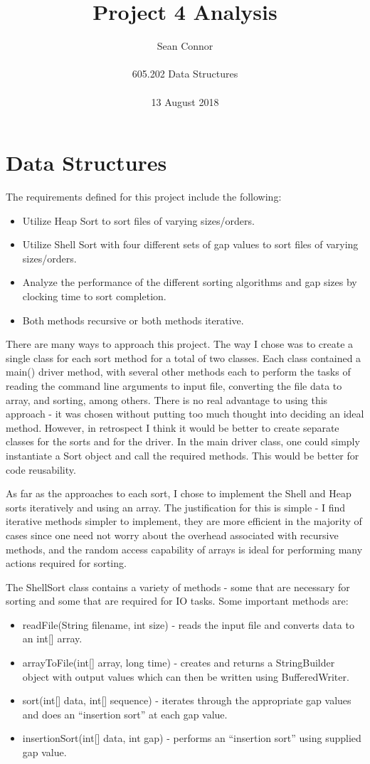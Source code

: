 \documentclass[12pt, titlepage]{article}
\title{Project 4 Analysis}
\author{Sean Connor \\ \\ 605.202 Data Structures \\ \\ 13 August 2018}
\date{}
\begin{document}
\maketitle


\section {Data Structures}

The requirements defined for this project include the following:
\begin{itemize}
	\item Utilize Heap Sort to sort files of varying sizes/orders.
	\item Utilize Shell Sort with four different sets of gap values to sort files of varying sizes/orders.
	\item Analyze the performance of the different sorting algorithms and gap sizes by clocking time to sort completion.
	\item Both methods recursive or both methods iterative.
\end{itemize}

There are many ways to approach this project. The way I chose was to create a single class for each sort method for a total of two classes. Each class contained a main() driver method, with several other methods each to perform the tasks of reading the command line arguments to input file, converting the file data to array, and sorting, among others. There is no real advantage to using this approach - it was chosen without putting too much thought into deciding an ideal method. However, in retrospect I think it would be better to create separate classes for the sorts and for the driver. In the main driver class, one could simply instantiate a Sort object and call the required methods. This would be better for code reusability.

As far as the approaches to each sort, I chose to implement the Shell and Heap sorts iteratively and using an array. The justification for this is simple - I find iterative methods simpler to implement, they are more efficient in the majority of cases since one need not worry about the overhead associated with recursive methods, and the random access capability of arrays is ideal for performing many actions required for sorting. 

The ShellSort class contains a variety of methods - some that are necessary for sorting and some that are required for IO tasks. Some important methods are:
\begin{itemize}
	\item readFile(String filename, int size) - reads the input file and converts data to an int[] array.
	\item arrayToFile(int[] array, long time) - creates and returns a StringBuilder object with output values which can then be written using BufferedWriter. 
	\item sort(int[] data, int[] sequence) - iterates through the appropriate gap values and does an ``insertion sort'' at each gap value.
	\item insertionSort(int[] data, int gap) - performs an ``insertion sort'' using supplied gap value.
\end{itemize}
\end{document}
